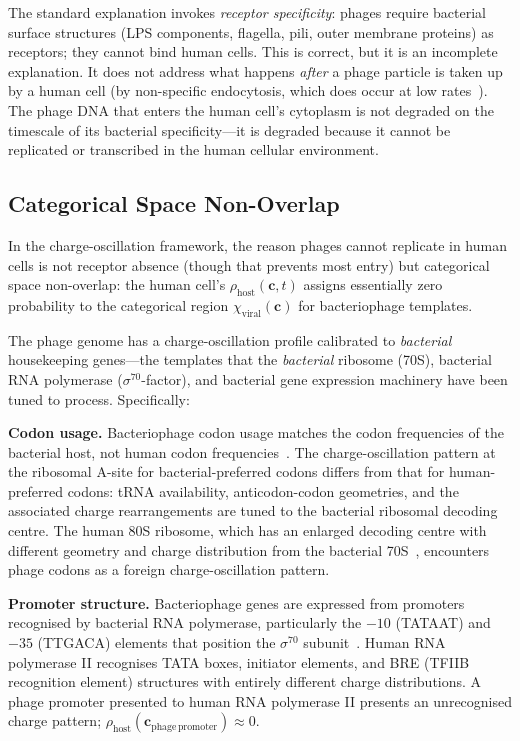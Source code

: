 \documentclass[12pt,a4paper]{article}
\theoremstyle{definition}
\theoremstyle{remark}
\newcommand{\Phost}{\rho_{\mathrm{host}}}
\newcommand{\chiviral}{\chi_{\mathrm{viral}}}
\newcommand{\vv}[1]{\boldsymbol{#1}}
\begin{document}
The standard explanation invokes \emph{receptor specificity}: phages require bacterial surface structures (LPS components, flagella, pili, outer membrane proteins) as receptors; they cannot bind human cells. This is correct, but it is an incomplete explanation. It does not address what happens \emph{after} a phage particle is taken up by a human cell (by non-specific endocytosis, which does occur at low rates~\cite{Nguyen2017,Barr2013}). The phage DNA that enters the human cell's cytoplasm is not degraded on the timescale of its bacterial specificity---it is degraded because it cannot be replicated or transcribed in the human cellular environment.

\subsection{Categorical Space Non-Overlap}

In the charge-oscillation framework, the reason phages cannot replicate in human cells is not receptor absence (though that prevents most entry) but categorical space non-overlap: the human cell's $\Phost(\vv{c}, t)$ assigns essentially zero probability to the categorical region $\chiviral(\vv{c})$ for bacteriophage templates.

The phage genome has a charge-oscillation profile calibrated to \emph{bacterial} housekeeping genes---the templates that the \emph{bacterial} ribosome (70S), bacterial RNA polymerase ($\sigma^{70}$-factor), and bacterial gene expression machinery have been tuned to process. Specifically:

\textbf{Codon usage.} Bacteriophage codon usage matches the codon frequencies of the bacterial host, not human codon frequencies~\cite{Karlin2001,Nakamura2000}. The charge-oscillation pattern at the ribosomal A-site for bacterial-preferred codons differs from that for human-preferred codons: tRNA availability, anticodon-codon geometries, and the associated charge rearrangements are tuned to the bacterial ribosomal decoding centre. The human 80S ribosome, which has an enlarged decoding centre with different geometry and charge distribution from the bacterial 70S~\cite{Melnikov2012}, encounters phage codons as a foreign charge-oscillation pattern.

\textbf{Promoter structure.} Bacteriophage genes are expressed from promoters recognised by bacterial RNA polymerase, particularly the $-10$ (TATAAT) and $-35$ (TTGACA) elements that position the $\sigma^{70}$ subunit~\cite{Haugen2008}. Human RNA polymerase II recognises TATA boxes, initiator elements, and BRE (TFIIB recognition element) structures with entirely different charge distributions. A phage promoter presented to human RNA polymerase II presents an unrecognised charge pattern; $\Phost(\vv{c}_{\mathrm{phage\,promoter}}) \approx 0$.
\end{document}
